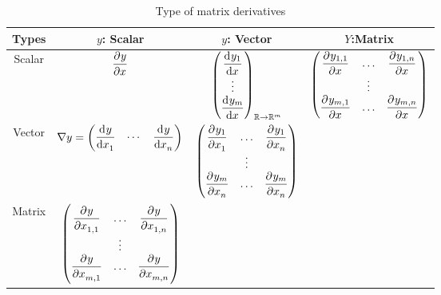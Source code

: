 \begin{table}[H]
\centering
\renewcommand*{\arraystretch}{1}
\begin{tabular}[t]{c|c|c|c}
\hline
Types & $y$: Scalar & ${y}$: Vector & $Y$:Matrix \\
\hline
Scalar & $\dpd{y}{x}$ & $\begin{pmatrix}
    \dod{y_1}{x} \\
    \vdots \\
    \dod{y_m}{x}
\end{pmatrix}_{\realset \rightarrow \realset^m} $ & $\begin{pmatrix}
            \dpd{y_{1,1}}{x} & \hdots & \dpd{y_{1,n}}{x} \\
            & \vdots \\
            \dpd{y_{m,1}}{x} & \hdots & \dpd{y_{m,n}}{x}
        \end{pmatrix}$ \\[4ex]
Vector & $\nabla y = \begin{pmatrix}
    \dod{y}{x_1} & \cdots & \dod{y}{x_n}
\end{pmatrix}$ & $\begin{pmatrix}
            \dpd{y_1}{x_1} & \hdots & \dpd{y_1}{x_n} \\
            & \vdots \\
            \dpd{y_m}{x_n} & \hdots & \dpd{y_m}{x_n}
        \end{pmatrix}$ &  \\[4ex]
Matrix & $\begin{pmatrix}
            \dpd{y}{x_{1,1}} & \hdots & \dpd{y}{x_{1,n}} \\
            & \vdots \\
            \dpd{y}{x_{m,1}} & \hdots & \dpd{y}{x_{m,n}}
        \end{pmatrix}$ &   & \\[4ex]
\end{tabular}
\caption{Type of matrix derivatives}
\end{table}


